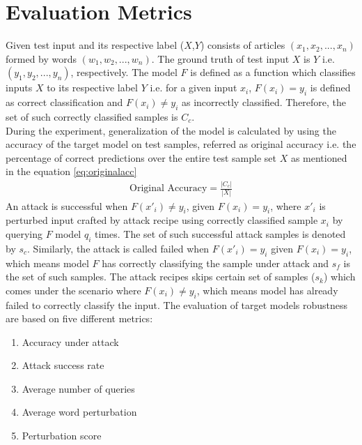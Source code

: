 \documentclass[%
	BCOR=8mm, %
	DIV=12,
	toc=bibliography, %
	toc=listof, %
	oneside, %
	egregdoesnotlikesansseriftitles, %
	]{scrbook}
\begin{document}
\section{Evaluation Metrics}
\label{section:metrics}
Given test input and its respective label ($X$,$Y$) consists of articles $(x_{1},x_{2},...,x_{n})$ formed by words $(w_{1},w_{2},...,w_{n})$. The ground truth of test input $X$ is $Y$ i.e. $(y_{1},y_{2},...,y_{n})$, respectively. The model $F$ is defined as a function which classifies inputs $X$ to its respective label $Y$ i.e. for a given input $x_{i}$, $F(x_{i})=y_{i}$ is defined as correct classification and $F(x_{i})\not=y_{i}$  as incorrectly classified.  Therefore, the set of such correctly classified samples is  $C_{c}$. \\
 During the experiment, generalization of the model is calculated by using the accuracy of the target model on test samples, referred as original accuracy i.e. the percentage of correct predictions over the entire test sample set $X$ as mentioned in the equation \ref{eq:originalacc} \\
 \begin{equation}
    \begin{aligned}
        \mbox{Original Accuracy}=\frac{|C_{c}|}{|X|} 
        \label{eq:originalacc}
    \end{aligned}
\end{equation}
An attack is successful when $F(x'_{i})\not=y_{i}$, given $F(x_{i})=y_{i}$, where $x'_{i}$ is perturbed input crafted by attack recipe using correctly classified sample $x_{i}$ by querying $F$ model $q_{i}$ times. The set of such successful attack samples is denoted by $s_{c}$. Similarly, the attack is called failed when $F(x'_{i})=y_{i}$ given $F(x_{i})=y_{i}$, which means model $F$ has correctly classifying the sample under attack and $s_{f}$ is the set of such samples.  The attack recipes skips certain set of samples ($s_{k}$) which comes under the scenario where  $F(x_{i})\not=y_{i}$,  which means model has already failed to correctly classify the input.
The evaluation of target models robustness are based on five different metrics: 
\begin{enumerate}
    \item Accuracy under attack 
    \item Attack success rate
    \item Average number of queries
    \item Average word perturbation 
    \item Perturbation score
\end{enumerate}
\end{document}
